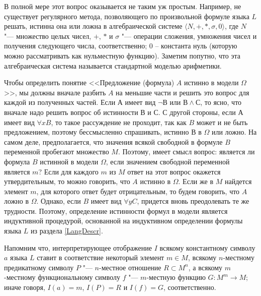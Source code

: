\documentclass[b5paper,11pt]{book}
\numberwithin{Def}{section}
\numberwithin{Th}{chapter}
\numberwithin{St}{chapter}
\begin{document}
	В полной мере этот вопрос  оказывается не таким уж простым.	Например, не существует регулярного метода, позволяющего по произвольной формуле языка $L$ решать, истинна она или ложна в алгебраической системе $\langle N, +, *,\sigma, 0\rangle$, где $N$ "--- множество целых чисел, $+$, $*$ и $\sigma$ "--- операции сложения, умножения чисел и получения следующего числа, соответственно; 0 – константа нуль (которую можно рассматривать как нульместную функцию). Заметим попутно, что эта алгебраическая  система называется стандартной моделью арифметики.
	
	Чтобы определить понятие <<Предложение (формула) $A$ истинно в модели $\Omega$>>, мы должны вначале разбить $A$ на меньшие части и решить это вопрос для каждой из полученных частей. Если $А$ имеет вид  $\neg В$ или $В\wedge С$, то ясно, что вначале надо решить вопрос об истинности $В$ и $С$. С другой стороны, если $А$ имеет вид $\forall x B$, то такое рассуждение не проходит, так как $B$ может и не быть предложением, поэтому бессмысленно спрашивать,  истинно $В$ в $\Omega$ или ложно. На самом деле, предполагается, что значения всякой свободной в формуле $B$ переменной пробегают множество $M$. Поэтому, имеет смысл вопрос: является ли формула $B$ истинной в модели $\Omega$, если значением  свободной переменной является $m$? Если для каждого $m$ из $M$ ответ на этот вопрос окажется утвердительным, то можно говорить, что $A$ истинно в $\Omega$. Если же в $M$ найдется элемент $m$, для которого ответ будет отрицательным, то будем говорить, что $A$ ложно в $\Omega$. Однако, если $B$ имеет вид $\forall y C$, придется вновь преодолевать те же трудности. Поэтому, определение истинности формул в модели является  индуктивной процедурой, основанной на индуктивном определении формулы языка $L$ из раздела \ref{LangDescr}.
	
	Напомним что, интерпретирующее отображение $I$ всякому константному символу $a$ языка $L$  ставит в соответствие некоторый элемент $m\in M$, всякому $n$-местному предикатному символу $P$ "--- $n$-местное отношение $R\subset M^n$, а всякому $m$-местному функциональному символу $f$ "--- $m$-местную функцию $G:M^m\rightarrow M$; иначе говоря,  $I(a)=m$, $I(P)=R$ и $I(f)=G$, соответственно. 
	
\end{document}

